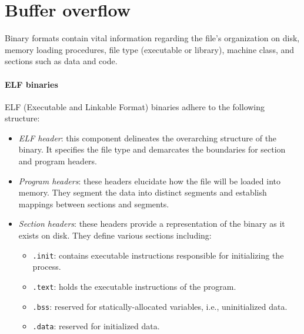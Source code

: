 \section{Buffer overflow}

Binary formats contain vital information regarding the file's organization on disk, memory loading procedures, file type (executable or library), machine class, and sections such as data and code. 

\paragraph*{ELF binaries}
ELF (Executable and Linkable Format) binaries adhere to the following structure:
\begin{itemize}
    \item \textit{ELF header}: this component delineates the overarching structure of the binary. 
        It specifies the file type and demarcates the boundaries for section and program headers.
    \item \textit{Program headers}: these headers elucidate how the file will be loaded into memory. 
        They segment the data into distinct segments and establish mappings between sections and segments.
    \item \textit{Section headers}: these headers provide a representation of the binary as it exists on disk. 
        They define various sections including:
        \begin{itemize}
            \item \texttt{.init}: contains executable instructions responsible for initializing the process.
            \item \texttt{.text}: holds the executable instructions of the program.
            \item \texttt{.bss}: reserved for statically-allocated variables, i.e., uninitialized data.
            \item \texttt{.data}: reserved for initialized data.
        \end{itemize}
\end{itemize}


